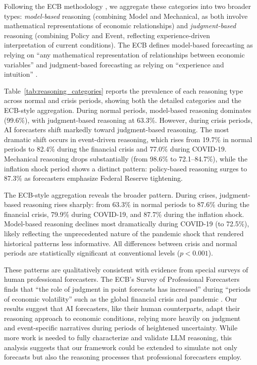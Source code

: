 \documentclass[11pt,letterpaper]{scrartcl}
\begin{document}
Following the ECB methodology \citep{ecb_spf_specialsurvey_2024}, we aggregate these categories into two broader types: \textit{model-based} reasoning (combining Model and Mechanical, as both involve mathematical representations of economic relationships) and \textit{judgment-based} reasoning (combining Policy and Event, reflecting experience-driven interpretation of current conditions). The ECB defines model-based forecasting as relying on ``any mathematical representation of relationships between economic variables'' and judgment-based forecasting as relying on ``experience and intuition'' \citep{ECB_SPF_2018_SpecialSurvey}.

Table~\ref{tab:reasoning_categories} reports the prevalence of each reasoning type across normal and crisis periods, showing both the detailed categories and the ECB-style aggregation. During normal periods, model-based reasoning dominates (99.6\%), with judgment-based reasoning at 63.3\%. However, during crisis periods, AI forecasters shift markedly toward judgment-based reasoning. The most dramatic shift occurs in event-driven reasoning, which rises from 19.7\% in normal periods to 82.4\% during the financial crisis and 77.0\% during COVID-19. Mechanical reasoning drops substantially (from 98.6\% to 72.1--84.7\%), while the inflation shock period shows a distinct pattern: policy-based reasoning surges to 87.3\% as forecasters emphasize Federal Reserve tightening. 

The ECB-style aggregation reveals the broader pattern. During crises, judgment-based reasoning rises sharply: from 63.3\% in normal periods to 87.6\% during the financial crisis, 79.9\% during COVID-19, and 87.7\% during the inflation shock. Model-based reasoning declines most dramatically during COVID-19 (to 72.5\%), likely reflecting the unprecedented nature of the pandemic shock that rendered historical patterns less informative. All differences between crisis and normal periods are statistically significant at conventional levels ($p < 0.001$).

These patterns are qualitatively consistent with evidence from special surveys of human professional forecasters. The ECB's Survey of Professional Forecasters finds that ``the role of judgment in point forecasts has increased'' during ``periods of economic volatility'' such as the global financial crisis and pandemic \citep{ecb_spf_specialsurvey_2024}. Our results suggest that AI forecasters, like their human counterparts, adapt their reasoning approach to economic conditions, relying more heavily on judgment and event-specific narratives during periods of heightened uncertainty. While more work is needed to fully characterize and validate LLM reasoning, this analysis suggests that our framework could be extended to simulate not only forecasts but also the reasoning processes that professional forecasters employ.
\end{document}
